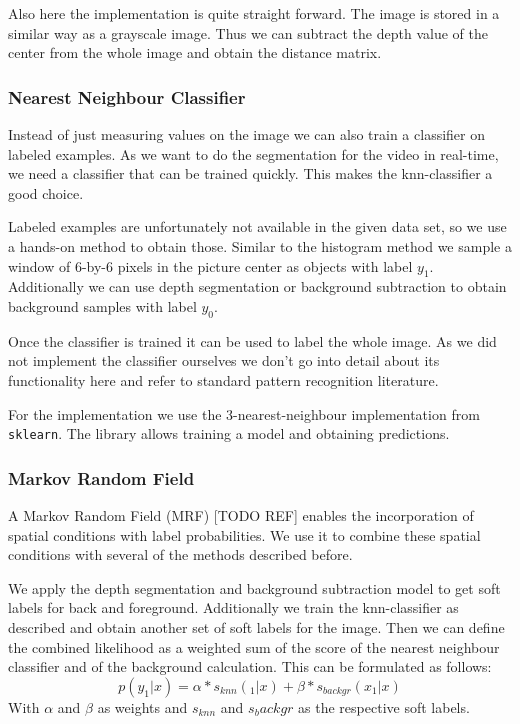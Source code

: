 \documentclass[letterpaper, 10 pt, conference]{ieeeconf}  %
\begin{document}
Also here the implementation is quite straight forward. The image is stored in a similar way as a grayscale image. Thus we can subtract the depth value of the center from the whole image and obtain the distance matrix. 

\subsubsection{Nearest Neighbour Classifier}

Instead of just measuring values on the image we can also train a classifier on labeled examples. As we want to do the segmentation for the video in real-time, we need a classifier that can be trained quickly. This makes the knn-classifier a good choice.

Labeled examples are unfortunately not available in the given data set, so we use a hands-on method to obtain those. Similar to the histogram method we sample a window of 6-by-6 pixels in the picture center as objects with label $y_1$. Additionally we can use depth segmentation or background subtraction to obtain background samples with label $y_0$. 

Once the classifier is trained it can be used to label the whole image. As we did not implement the classifier ourselves we don't go into detail about its functionality here and refer to standard pattern recognition literature.

For the implementation we use the 3-nearest-neighbour implementation from \texttt{sklearn}. The library allows training a model and obtaining predictions.

\subsubsection{Markov Random Field}

A Markov Random Field (MRF) [TODO REF] enables the incorporation of spatial conditions with label probabilities. We use it to combine these spatial conditions with several of the methods described before.

We apply the depth segmentation and background subtraction model to get soft labels for back and foreground. Additionally we train the knn-classifier as described and obtain another set of soft labels for the image. Then we can define the combined likelihood as a weighted sum of the score of the nearest neighbour classifier and of the background calculation. This can be formulated as follows:
\begin{equation}
p(y_1 | x) = \alpha * s_{knn}(_1 | x) + \beta * s_{backgr}(x_1 | x) 
\end{equation}
With $\alpha$ and $\beta$ as weights and $s_{knn}$ and $s_backgr$ as the respective soft labels.
\end{document}
